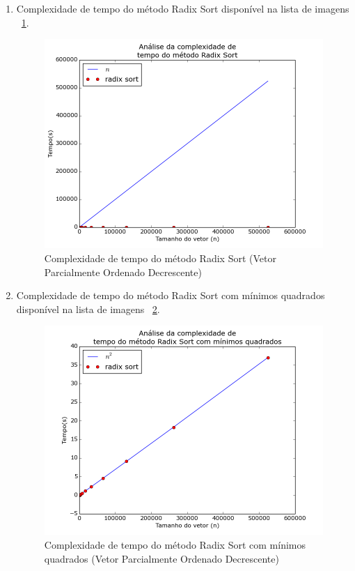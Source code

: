 \documentclass[12pt,a4paper,twoside]{report}
\begin{document}
\begin{enumerate}
										\begin{enumerate}
											\item Complexidade de tempo do método Radix Sort disponível na lista de imagens ~\ref{fig:RadixPlot2POD}.
											\begin{figure}[!h]
												\centering
												\includegraphics[scale=0.6]{../imagens/Radix/radix_plot_2_parcialmente_ordenado_decrescente.png}
												\caption{Complexidade de tempo do método Radix Sort (Vetor Parcialmente Ordenado Decrescente) \label{fig:RadixPlot2POD}}
											\end{figure}


											\item Complexidade de tempo do método Radix Sort com mínimos quadrados disponível na lista de imagens  ~\ref{fig:RadixPlot3POD}.
											\begin{figure}[!h]
												\centering
												\includegraphics[scale=0.6]{../imagens/Radix/radix_plot_3_parcialmente_ordenado_decrescente.png}
												\caption{Complexidade de tempo do método Radix Sort com mínimos quadrados (Vetor Parcialmente Ordenado Decrescente) \label{fig:RadixPlot3POD}}
											\end{figure}

										\end{enumerate}


\end{enumerate}
\end{document}
